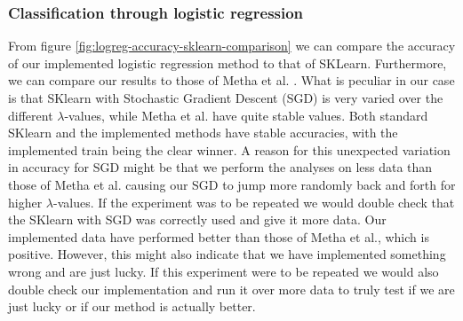 \documentclass[11pt]{article}
\begin{document}
\subsubsection{Classification through logistic regression}
From figure \ref{fig:logreg-accuracy-sklearn-comparison} we can compare the accuracy of our implemented logistic regression method to that of SKLearn. Furthermore, we can compare our results to those of Metha et al. \cite{2018arXiv180308823M}. What is peculiar in our case is that SKlearn with Stochastic Gradient Descent (SGD) is very varied over the different $\lambda$-values, while Metha et al. have quite stable values. Both standard SKlearn and the implemented methods have stable accuracies, with the implemented train being the clear winner. A reason for this unexpected variation in accuracy for SGD might be that we perform the analyses on less data than those of Metha et al. causing our SGD to jump more randomly back and forth for higher $\lambda$-values. If the experiment was to be repeated we would double check that the SKlearn with SGD was correctly used and give it more data. Our implemented data have performed better than those of Metha et al., which is positive. However, this might also indicate that we have implemented something wrong and are just lucky. If this experiment were to be repeated we would also double check our implementation and run it over more data to truly test if we are just lucky or if our method is actually better.
\end{document}
